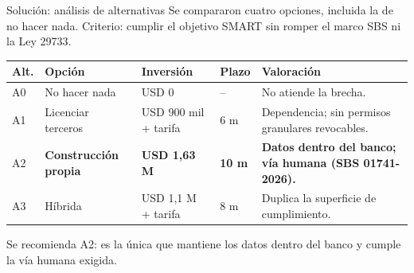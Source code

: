 \documentclass[aspectratio=169,11pt]{beamer}
\begin{document}
\begin{frame}{Solución: análisis de alternativas}
\vspace{0.1cm}
{\small Se compararon cuatro opciones, incluida la de no hacer nada. Criterio: cumplir el objetivo SMART sin romper el marco SBS ni la Ley 29733.}
\vspace{0.3cm}
\begin{center}
\footnotesize
\begin{tabular}{lp{2.6cm}p{2.3cm}lp{5.4cm}}
\toprule
\textbf{Alt.} & \textbf{Opción} & \textbf{Inversión} & \textbf{Plazo} & \textbf{Valoración} \\
\midrule
A0 & No hacer nada & USD 0 & -- & No atiende la brecha. \\
A1 & Licenciar terceros & USD 900 mil + tarifa & 6 m & Dependencia; sin permisos granulares revocables. \\
\rowcolor{white} A2 & \textbf{Construcción propia} & \textbf{USD 1,63 M} & \textbf{10 m} & \textbf{Datos dentro del banco; vía humana (SBS 01741-2026).} \\
A3 & Híbrida & USD 1,1 M + tarifa & 8 m & Duplica la superficie de cumplimiento. \\
\bottomrule
\end{tabular}
\end{center}
\vspace{0.25cm}
{\small\color{muted} Se recomienda A2: es la única que mantiene los datos dentro del banco y cumple la vía humana exigida.}
\end{frame}
\end{document}
